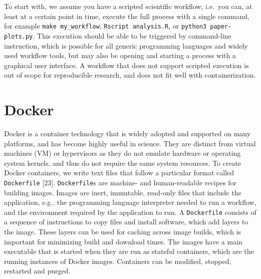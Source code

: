 \documentclass[10pt,letterpaper]{article}
\begin{document}
To start with, we assume you have a scripted scientific workflow,
i.e.~you can, at least at a certain point in time, execute the full
process with a single command, for example \texttt{make\ my\_workflow},
\texttt{Rscript\ analysis.R}, or \texttt{python3\ paper-plots.py}. This
execution should be able to be triggered by command-line instruction,
which is possible for all generic programming languages and widely used
workflow tools, but may also be opening and starting a process with a
graphical user interface. A workflow that does not support scripted
execution is out of scope for reproducible research, and does not fit
well with containerization.

\hypertarget{docker}{%
\section{Docker}\label{docker}}

Docker is a container technology that is widely adopted and supported on
many platforms, and has become highly useful in science. They are
distinct from virtual machines (VM) or hypervisors as they do not
emulate hardware or operating system kernels, and thus do not require
the same system resources. To create Docker containers, we write text
files that follow a particular format called \texttt{Dockerfile}
{[}23{]}. \texttt{Dockerfile}s are machine- and human-readable recipes
for building images. Images are inert, immutable, read-only files that
include the application, e.g., the programming language interpreter
needed to run a workflow, and the environment required by the
application to run. A \texttt{Dockerfile} consists of a sequence of
instructions to copy files and install software, which add layers to the
image. These layers can be used for caching across image builds, which
is important for minimizing build and download times. The images have a
main executable that is started when they are run as stateful
containers, which are the running instances of Docker images. Containers
can be modified, stopped, restarted and purged.
\end{document}
